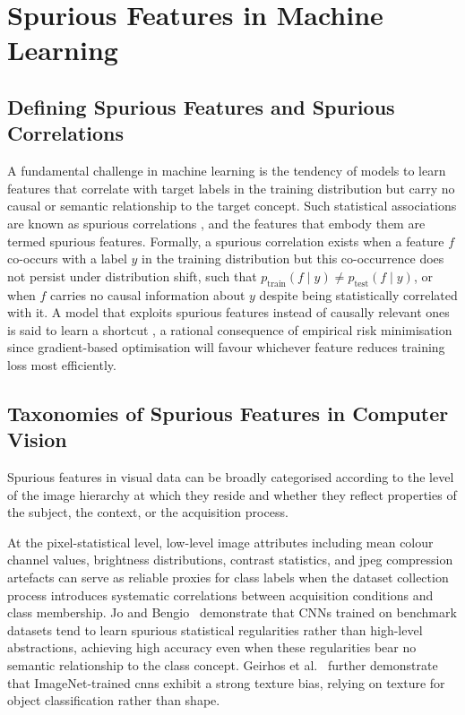 \section{Spurious Features in Machine Learning}
\label{sec:spurious_features}

\subsection*{Defining Spurious Features and Spurious Correlations}
\label{subsec:spurious_definitions}

A fundamental challenge in machine learning is the tendency of models to learn
features that correlate with target labels in the training distribution but carry no
causal or semantic relationship to the target concept. Such statistical associations
are known as spurious correlations \cite{Arjovsky_2020_InvariantRiskMinimization, Sagawa_2020_DistributionallyRobustNeuralNetworksForGroupShifts}, and the features
that embody them are termed spurious features. Formally, a spurious correlation exists when a feature $f$ co-occurs with a label $y$ in the training distribution but this co-occurrence does not persist under distribution shift, such that $p_{\text{train}}(f \mid y) \neq p_{\text{test}}(f \mid y)$, or when
$f$ carries no causal information about $y$ despite being statistically correlated
with it. A model that exploits spurious features instead of causally relevant ones is said to learn a
shortcut \cite{Geirhos_2020_ShortcutLearningInDeepNeuralNetworks}, a rational
consequence of empirical risk minimisation since gradient-based optimisation will
favour whichever feature reduces training loss most efficiently.

\subsection*{Taxonomies of Spurious Features in Computer Vision}
\label{subsec:spurious_taxonomy}

Spurious features in visual data can be broadly categorised according to the level of the
image hierarchy at which they reside and whether they reflect properties of the subject, the
context, or the acquisition process.

At the pixel-statistical level, low-level image attributes including mean colour
channel values, brightness distributions, contrast statistics, and jpeg compression
artefacts can serve as reliable proxies for class labels when the dataset collection
process introduces systematic correlations between acquisition conditions and class
membership. Jo and Bengio~\cite{Jo_2017_SurfaceStatisticalRegularities} demonstrate that
CNNs trained on benchmark datasets tend to learn spurious statistical regularities
rather than high-level abstractions, achieving high accuracy even when these regularities
bear no semantic relationship to the class concept. Geirhos et al.~\cite{Geirhos_2019_TextureBias} further demonstrate that ImageNet-trained \acrshort{cnn}s exhibit a strong texture bias, relying on texture for object
classification rather than shape.

